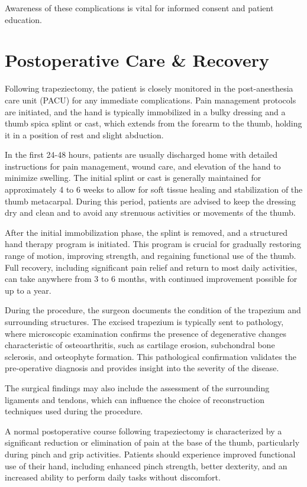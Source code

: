 Awareness of these complications is vital for informed consent and patient education.

\section*{Postoperative Care \& Recovery}
Following trapeziectomy, the patient is closely monitored in the post-anesthesia care unit (PACU) for any immediate complications. Pain management protocols are initiated, and the hand is typically immobilized in a bulky dressing and a thumb spica splint or cast, which extends from the forearm to the thumb, holding it in a position of rest and slight abduction.

In the first 24-48 hours, patients are usually discharged home with detailed instructions for pain management, wound care, and elevation of the hand to minimize swelling. The initial splint or cast is generally maintained for approximately 4 to 6 weeks to allow for soft tissue healing and stabilization of the thumb metacarpal. During this period, patients are advised to keep the dressing dry and clean and to avoid any strenuous activities or movements of the thumb.

After the initial immobilization phase, the splint is removed, and a structured hand therapy program is initiated. This program is crucial for gradually restoring range of motion, improving strength, and regaining functional use of the thumb. Full recovery, including significant pain relief and return to most daily activities, can take anywhere from 3 to 6 months, with continued improvement possible for up to a year.

During the procedure, the surgeon documents the condition of the trapezium and surrounding structures. The excised trapezium is typically sent to pathology, where microscopic examination confirms the presence of degenerative changes characteristic of osteoarthritis, such as cartilage erosion, subchondral bone sclerosis, and osteophyte formation. This pathological confirmation validates the pre-operative diagnosis and provides insight into the severity of the disease.

The surgical findings may also include the assessment of the surrounding ligaments and tendons, which can influence the choice of reconstruction techniques used during the procedure.

A normal postoperative course following trapeziectomy is characterized by a significant reduction or elimination of pain at the base of the thumb, particularly during pinch and grip activities. Patients should experience improved functional use of their hand, including enhanced pinch strength, better dexterity, and an increased ability to perform daily tasks without discomfort. 

